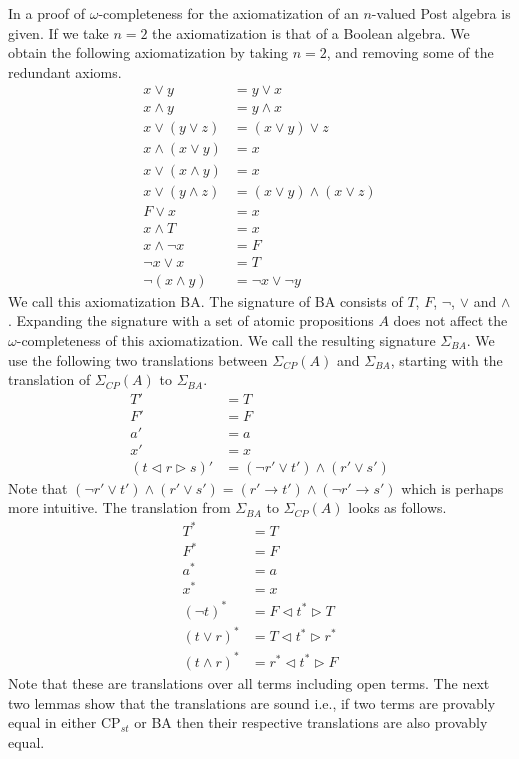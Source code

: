\documentclass[a4paper,twoside,openright]{report}
\newcommand{\sig}{\ensuremath{\Sigma_{CP}(A)}}
\newcommand{\lef}{\ensuremath{\triangleleft}}
\newcommand{\rig}{\ensuremath{\triangleright}}
\begin{document}
In \cite{omega_bergstra} a proof of $\omega$-completeness for the axiomatization of an $n$-valued Post algebra is given. If we take $n=2$ the axiomatization is that of a Boolean algebra. We obtain the following axiomatization by taking $n=2$, and removing some of the redundant axioms.
\begin{align*}
x\vee y &= y\vee x\\
x\wedge y &= y\wedge x\\
x\vee(y\vee z) &= (x\vee y)\vee z\\
x\wedge(x\vee y) &= x\\
x\vee(x\wedge y) &= x\\
x\vee(y\wedge z) &= (x\vee y)\wedge (x\vee z)\\
F\vee x &= x\\
x\wedge T &= x\\
x\wedge\neg x &= F\\
\neg x\vee x &= T\\
\neg(x\wedge y) &= \neg x\vee\neg y
\end{align*}
We call this axiomatization BA. The signature of BA consists of $T$, $F$, $\neg$, $\vee$ and $\wedge$. Expanding the signature with a set of atomic propositions $A$ does not affect the $\omega$-completeness of this axiomatization. We call the resulting signature $\Sigma_{BA}$. We use the following two translations between $\sig$ and $\Sigma_{BA}$, starting with the translation of $\sig$ to $\Sigma_{BA}$.
\begin{align*}
T' &= T\\
F' &= F\\
a' &= a\\
x' &= x\\
(t\lef r\rig s)' &= (\neg r'\vee t')\wedge(r'\vee s')
\end{align*}
Note that $(\neg r'\vee t')\wedge(r'\vee s')=(r'\to t')\wedge(\neg r'\to s')$ which is perhaps more intuitive. The translation from $\Sigma_{BA}$ to $\sig$ looks as follows.
\begin{align*}
T^* &= T\\
F^* &= F\\
a^* &= a\\
x^* &= x\\
(\neg t)^* &= F\lef t^*\rig T\\
(t\vee r)^* &= T\lef t^*\rig r^*\\
(t\wedge r)^* &= r^*\lef t^*\rig F
\end{align*}
Note that these are translations over all terms including open terms. The next two lemmas show that the translations are sound i.e., if two terms are provably equal in either $\text{CP}_{st}$ or BA then their respective translations are also provably equal.
\end{document}
